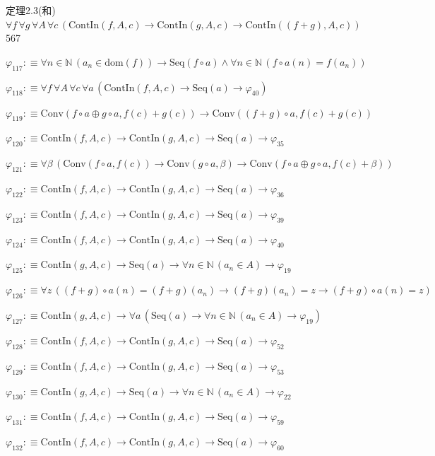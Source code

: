 \begin{fullproof}{定理2.3(和)}{$\forall f\,\forall g\,\forall A\,\forall c\,(\mathrm{ContIn}(f,A,c) \to \mathrm{ContIn}(g,A,c) \to \mathrm{ContIn}((f + g),A,c))$}{567}
\begin{abbrevlist}
\item $\varphi_{117} :\equiv \forall n \in \mathbb{N}\,(a_{n} \in \mathrm{dom}(f)) \to \mathrm{Seq}(f \circ a) \land \forall n \in \mathbb{N}\,(f \circ a(n) = f(a_{n}))$
\item $\varphi_{118} :\equiv \forall f\,\forall A\,\forall c\,\forall a\,(\mathrm{ContIn}(f,A,c) \to \mathrm{Seq}(a) \to \varphi_{40})$
\item $\varphi_{119} :\equiv \mathrm{Conv}(f \circ a \oplus g \circ a,f(c) + g(c)) \to \mathrm{Conv}((f + g) \circ a,f(c) + g(c))$
\item $\varphi_{120} :\equiv \mathrm{ContIn}(f,A,c) \to \mathrm{ContIn}(g,A,c) \to \mathrm{Seq}(a) \to \varphi_{35}$
\item $\varphi_{121} :\equiv \forall \beta\,(\mathrm{Conv}(f \circ a,f(c)) \to \mathrm{Conv}(g \circ a,\beta) \to \mathrm{Conv}(f \circ a \oplus g \circ a,f(c) + \beta))$
\item $\varphi_{122} :\equiv \mathrm{ContIn}(f,A,c) \to \mathrm{ContIn}(g,A,c) \to \mathrm{Seq}(a) \to \varphi_{36}$
\item $\varphi_{123} :\equiv \mathrm{ContIn}(f,A,c) \to \mathrm{ContIn}(g,A,c) \to \mathrm{Seq}(a) \to \varphi_{39}$
\item $\varphi_{124} :\equiv \mathrm{ContIn}(f,A,c) \to \mathrm{ContIn}(g,A,c) \to \mathrm{Seq}(a) \to \varphi_{40}$
\item $\varphi_{125} :\equiv \mathrm{ContIn}(g,A,c) \to \mathrm{Seq}(a) \to \forall n \in \mathbb{N}\,(a_{n} \in A) \to \varphi_{19}$
\item $\varphi_{126} :\equiv \forall z\,((f + g) \circ a(n) = (f + g)(a_{n}) \to (f + g)(a_{n}) = z \to (f + g) \circ a(n) = z)$
\item $\varphi_{127} :\equiv \mathrm{ContIn}(g,A,c) \to \forall a\,(\mathrm{Seq}(a) \to \forall n \in \mathbb{N}\,(a_{n} \in A) \to \varphi_{19})$
\item $\varphi_{128} :\equiv \mathrm{ContIn}(f,A,c) \to \mathrm{ContIn}(g,A,c) \to \mathrm{Seq}(a) \to \varphi_{52}$
\item $\varphi_{129} :\equiv \mathrm{ContIn}(f,A,c) \to \mathrm{ContIn}(g,A,c) \to \mathrm{Seq}(a) \to \varphi_{53}$
\item $\varphi_{130} :\equiv \mathrm{ContIn}(g,A,c) \to \mathrm{Seq}(a) \to \forall n \in \mathbb{N}\,(a_{n} \in A) \to \varphi_{22}$
\item $\varphi_{131} :\equiv \mathrm{ContIn}(f,A,c) \to \mathrm{ContIn}(g,A,c) \to \mathrm{Seq}(a) \to \varphi_{59}$
\item $\varphi_{132} :\equiv \mathrm{ContIn}(f,A,c) \to \mathrm{ContIn}(g,A,c) \to \mathrm{Seq}(a) \to \varphi_{60}$

\end{abbrevlist}
\end{fullproof}
